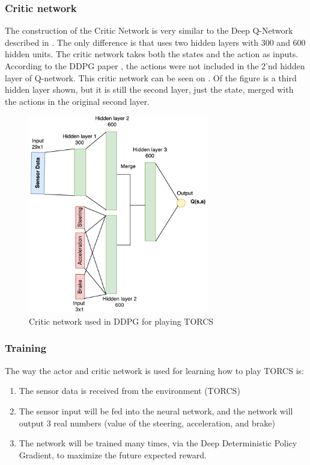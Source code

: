 \subsubsection{Critic network}
The construction of the Critic Network is very similar to the Deep Q-Network described in . The only difference is that uses two hidden layers with 300 and 600 hidden units. The critic network takes both the states and the action as inputs. According to the DDPG paper \cite{DBLP:journals/corr/LillicrapHPHETS15}, the actions were not included in the 2’nd hidden layer of Q-network. This critic network can be seen on . Of the figure is a third hidden layer shown, but it is still the second layer, just the state, merged with the actions in the original second layer. 

\begin{figure}[H]
	\centering
	\includegraphics[width=0.7\textwidth]{Figures/Architecture/DDPG/DDPG_Critic_network.pdf}
	\caption{Critic network used in DDPG for playing TORCS }
	\label{fig:DDPG_Critic_network}
\end{figure}  

\subsubsection{Training}
The way the actor and critic network is used for learning how to play TORCS is: 
\begin{enumerate}
	\item The sensor data is received from the environment (TORCS) 
	\item The sensor input will be fed into the neural network, and the network will output 3 real numbers (value of the steering, acceleration, and brake)
	\item The network will be trained many times, via the Deep Deterministic Policy Gradient, to maximize the future expected reward.
\end{enumerate}

